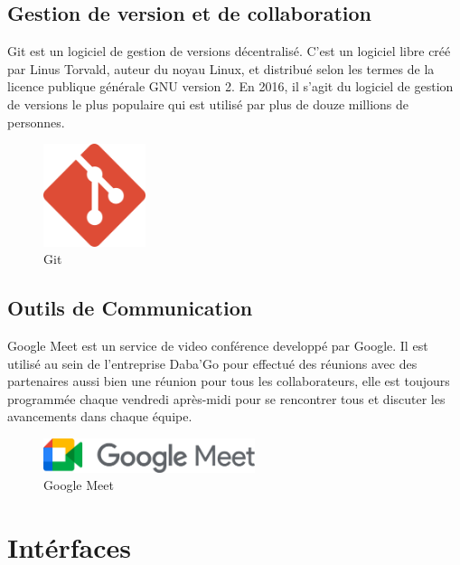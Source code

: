 \subsection{Gestion de version et de collaboration}
Git est un logiciel de gestion de versions décentralisé. C'est un logiciel libre créé par Linus Torvald, auteur du noyau Linux, et distribué selon les termes de la licence publique générale GNU version 2. En 2016, il s'agit du logiciel de gestion de versions le plus populaire qui est utilisé par plus de douze millions de personnes.
\\
\begin{figure}[!h]
\begin{center}
\includegraphics[height=3cm]{figures/git.png}
\end{center}
\caption{Git}
\end{figure}



\subsection{Outils de Communication}
Google Meet est un service de video conférence developpé par Google. Il est utilisé au sein de l'entreprise Daba'Go pour effectué des réunions avec des partenaires aussi bien une réunion pour tous les collaborateurs, elle est toujours programmée chaque vendredi après-midi pour se rencontrer tous et discuter les avancements dans chaque équipe.
\\
\begin{figure}[!h]
\begin{center}
\includegraphics[height=1cm]{figures/google_meet_logo.png}
\end{center}
\caption{Google Meet}
\end{figure}

\newpage
\section{Intérfaces}


